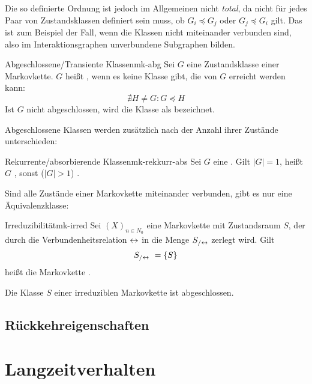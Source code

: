 Die so definierte Ordnung ist jedoch im Allgemeinen nicht \emph{total}, da nicht
für jedes Paar von Zustandsklassen definiert sein muss, ob $G_i\preceq G_j$ oder
$G_j \preceq G_i$ gilt. Das ist zum Beispiel der Fall, wenn die Klassen nicht
miteinander verbunden sind, also im Interaktionsgraphen unverbundene Subgraphen
bilden.

\begin{definition}{Abgeschlossene/Transiente Klassen}{mk-abg}
Sei $G$ eine Zustandsklasse einer Markovkette. $G$ heißt ,
wenn es keine Klasse gibt, die von $G$ erreicht werden kann:
\[
\nexists H\ne G: G\preceq H
\]
Ist $G$ nicht abgeschlossen, wird die Klasse als  bezeichnet.
\end{definition}

Abgeschlossene Klassen werden zusätzlich nach der Anzahl ihrer Zustände
unterschieden:

\begin{definition}{Rekurrente/absorbierende Klassen}{mk-rekkurr-abs}
Sei $G$ eine . Gilt $|G|=1$, heißt $G$
, sonst ($|G| > 1$) .
\end{definition}

Sind alle Zustände einer Markovkette miteinander verbunden, gibt es nur eine
Äquivalenzklasse:
\begin{definition}{Irreduzibilität}{mk-irred}
Sei $(X)_{n\in N_0}$ eine Markovkette mit Zustandsraum $S$, der durch die
Verbundenheitsrelation $\leftrightarrow$ in die Menge $S_{/\leftrightarrow}$ zerlegt wird. Gilt
\[
S_{/\leftrightarrow}\ = \{S\}
\]
heißt die Markovkette .
\end{definition}
\begin{lemma}
Die Klasse $S$ einer irreduziblen Markovkette ist abgeschlossen.
\end{lemma}
 
\subsection{Rückkehreigenschaften}

\section{Langzeitverhalten}
